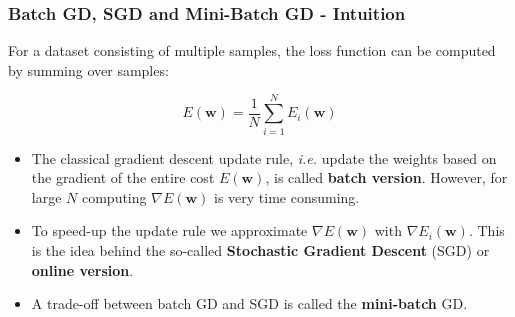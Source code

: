 \documentclass{beamer}
\begin{document}
	\begin{frame}
		\frametitle{Batch GD, SGD and Mini-Batch GD - Intuition}
		
		For a dataset consisting of multiple samples, the loss function can be computed by summing over samples:
		
		$$E(\bm{w}) = \frac{1}{N} \sum_{i=1}^N E_i(\bm{w})$$
		
		\begin{itemize}
			\item The classical gradient descent update rule, \textit{i.e.} update the weights based on the gradient of the entire cost $E(\bm{w})$, is called \textbf{batch version}. However, for large $N$ computing $\nabla E(\bm{w})$ is very time consuming.
			
			\item To speed-up the update rule we approximate $\nabla E(\bm{w})$ with $\nabla E_i(\bm{w})$. This is the idea behind the so-called \textbf{Stochastic Gradient Descent} (SGD) or \textbf{online version}.
			
			\item A trade-off between batch GD and SGD is called the \textbf{mini-batch} GD.
		\end{itemize}
		
	\end{frame}
\end{document}
